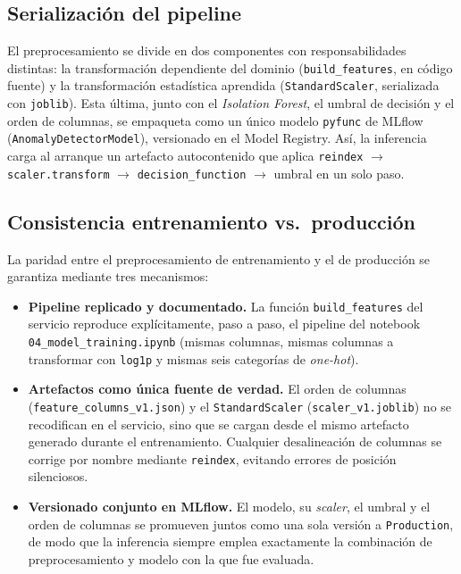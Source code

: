 \subsection{Serialización del pipeline}

El preprocesamiento se divide en dos componentes con responsabilidades
distintas: la transformación dependiente del dominio (\texttt{build\_features},
en código fuente) y la transformación estadística aprendida
(\texttt{StandardScaler}, serializada con \texttt{joblib}). Esta última, junto
con el \textit{Isolation Forest}, el umbral de decisión y el orden de columnas,
se empaqueta como un único modelo \texttt{pyfunc} de MLflow
(\texttt{AnomalyDetectorModel}), versionado en el Model Registry. Así, la
inferencia carga al arranque un artefacto autocontenido que aplica
\texttt{reindex} $\rightarrow$ \texttt{scaler.transform} $\rightarrow$
\texttt{decision\_function} $\rightarrow$ umbral en un solo paso.

\subsection{Consistencia entrenamiento vs.\ producción}

La paridad entre el preprocesamiento de entrenamiento y el de producción se
garantiza mediante tres mecanismos:

\begin{itemize}
  \item \textbf{Pipeline replicado y documentado.} La función
  \texttt{build\_features} del servicio reproduce explícitamente, paso a paso, el
  pipeline del notebook \texttt{04\_model\_training.ipynb} (mismas columnas,
  mismas columnas a transformar con \texttt{log1p} y mismas seis categorías de
  \textit{one-hot}).
  \item \textbf{Artefactos como única fuente de verdad.} El orden de columnas
  (\texttt{feature\_columns\_v1.json}) y el \texttt{StandardScaler}
  (\texttt{scaler\_v1.joblib}) no se recodifican en el servicio, sino que se
  cargan desde el mismo artefacto generado durante el entrenamiento. Cualquier
  desalineación de columnas se corrige por nombre mediante \texttt{reindex},
  evitando errores de posición silenciosos.
  \item \textbf{Versionado conjunto en MLflow.} El modelo, su \textit{scaler}, el
  umbral y el orden de columnas se promueven juntos como una sola versión a
  \texttt{Production}, de modo que la inferencia siempre emplea exactamente la
  combinación de preprocesamiento y modelo con la que fue evaluada.
\end{itemize}
